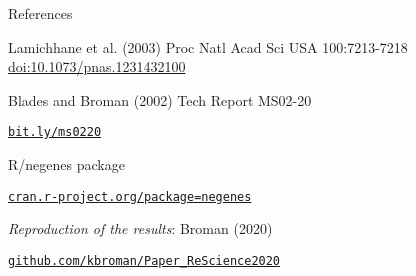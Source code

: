 \documentclass[aspectratio=169,12pt,t]{beamer}
\begin{document}
\begin{frame}{References}

  \bbi
\item Lamichhane et al. (2003) Proc Natl Acad Sci USA 100:7213-7218
    \href{https://doi.org/10.1073/pnas.1231432100}{doi:10.1073/pnas.1231432100}

  \item Blades and Broman (2002) Tech Report MS02-20

\href{https://www.biostat.wisc.edu/~kbroman/publications/ms0220.pdf}{\tt bit.ly/ms0220}

\item R/negenes package

  \href{https://cran.r-project.org/package=negenes}{\tt cran.r-project.org/package=negenes}

\item \emph{Reproduction of the results\/}: Broman (2020)

  \href{https://github.com/kbroman/Paper_ReScience2020}{\tt github.com/kbroman/Paper\_ReScience2020}

    \ei

\end{frame}
\end{document}
